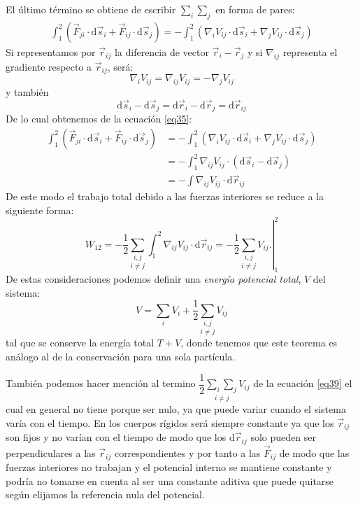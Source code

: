 \documentclass[../main]{subfiles}
\begin{document}
El último término se obtiene de escribir $\sum_i \sum_j$ en forma de pares:
\begin{align}
    \int_1^2 \left( \vec{F}_{ji}\cdot \text{d} \vec{s}_i +\vec{F}_{ij} \cdot \text{d} \vec{s}_j \right)=-\int_1^2 \left ( \nabla_i V_{ij} \cdot \text{d} \vec{s}_i+ \nabla_j V_{ij} \cdot \text{d} \vec{s}_j \right)
    \label{eq35}
\end{align}
Si representamos por $\vec{r}_{ij}$ la diferencia de vector $\vec{r}_i-\vec{r}_j$ y si $\nabla_{ij}$ representa el gradiente respecto a $\vec{r}_{ij}$, será:
\begin{equation}
    \nabla_i V_{ij}=\nabla_{ij} V_{ij}= -\nabla_j V_{ij}
    \label{eq36}
\end{equation}
y también
\begin{equation}
    \text{d} \vec{s}_i-\text{d}\vec{s}_j=\text{d} \vec{r}_i-\text{d}\vec{r}_j=\text{d} \vec{r}_{ij}
    \label{eq37}
\end{equation}
De lo cual obtenemos de la ecuación \eqref{eq35}:
\begin{align*}
    \int_1^2 \left( \vec{F}_{ji}\cdot \text{d} \vec{s}_i +\vec{F}_{ij} \cdot \text{d} \vec{s}_j \right)&=-\int_1^2 \left ( \nabla_i V_{ij} \cdot \text{d} \vec{s}_i+ \nabla_j V_{ij} \cdot \text{d} \vec{s}_j \right) \\
     &= -\int_1^2 \nabla_{ij} V_{ij} \cdot (\text{d} \vec{s}_i-\text{d}\vec{s}_j) \\
     &= - \int \nabla_{ij} V_{ij} \cdot \text{d} \vec{r}_{ij}
\end{align*}
De este modo el trabajo total debido a las fuerzas interiores se reduce a la siguiente forma:
\begin{equation}
    W_{12}=-\dfrac{1}{2} \underset{i \neq j}{\sum_{i,j}} \int_1^2 \nabla_{ij} V_{ij} \cdot \text{d}\vec{r}_{ij}=-\dfrac{1}{2} \left. \underset{i \neq j}{\sum_{i,j}} V_{ij} .\right |_1^2
    \label{eq38}
\end{equation}
De estas consideraciones podemos definir una \textit{energía potencial total}, $V$ del sistema:
\begin{equation}
    V=\sum_i V_i+\dfrac{1}{2} \underset{i \neq j}{\sum_{i,j}} V_{ij}
    \label{eq39}
\end{equation}
tal que se conserve la energía total $T+V$, donde tenemos que este teorema es análogo al de la conservación para una sola partícula. \\
\vspace{0.2cm}

También podemos hacer mención al termino $\dfrac{1}{2} \underset{i \neq j}{\sum_i \sum_j} V_{ij}$ de la ecuación \eqref{eq39} el cual en general no tiene porque ser nulo, ya que puede variar cuando el sistema varía con el tiempo. En los cuerpos rígidos será siempre constante ya que los $\vec{r}_{ij}$ son fijos y no varían con el tiempo de modo que los $\text{d}\vec{r}_{ij}$ solo pueden ser perpendiculares a las $\vec{r}_{ij}$ correspondientes y por tanto a las $\vec{F}_{ij}$ de modo que las fuerzas interiores no trabajan y el potencial interno se mantiene constante y podría no tomarse en cuenta al ser una constante aditiva que puede quitarse según elijamos la referencia nula del potencial.
\end{document}

